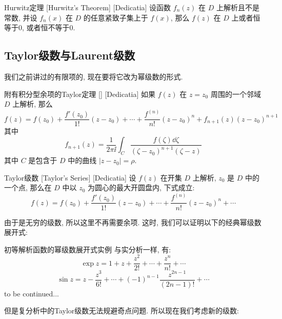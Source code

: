\documentclass[UTF8]{ctexart}
\newcommand{\continued}{{\Large to be continued...}}
\begin{document}
        \begin{thm}
            [UUID]
            {Hurwitz定理}
            [Hurwitz's Theorem]
            [Dedicatia]
            设函数 \(f_n(z)\) 在 \(D\) 上解析且不是常数, 并设 \(f_n(x)\) 在 \(D\) 的任意紧致子集上\UniformConvergence 于 \(f(x)\), 那么 \(f(z)\) 在 \(D\) 上或者恒等于0, 或者恒不等于0.
        \end{thm}
    
    \subsection{Taylor级数与Laurent级数}

        我们之前讲过的有限项的\TaylorThm, 现在要将它改为幂级数的形式. 

        \begin{thm}
            [UUID]
            {附有积分型余项的Taylor定理}
            []
            [Dedicatia]
            如果 \(f(z)\) 在 \(z=z_0\) 周围的一个邻域 \(D\) 上解析, 那么
            \[f(z)=f(z_0)+\frac{f'(z_0)}{1!}(z-z_0)+\cdots+\frac{f^{(n)}}{n!}(z-z_0)^n+f_{n+1}(z)(z-z_0)^{n+1}\]
            其中
            \[f_{n+1}(z)=\frac{1}{2\pi\ii}\int_C\frac{f(\zeta)\dd{\zeta}}{(\zeta-z_0)^{n+1}(\zeta-z)}\]
            其中 \(C\) 是包含于 \(D\) 中的曲线 \(|z-z_0|=\rho\). 
        \end{thm}

        \begin{thm}
            [TaylorSeries]
            {Taylor级数}
            [Taylor's Series]
            [Dedicatia]
            设 \(f(z)\) 在开集 \(D\) 上解析,  \(z_0\) 是 \(D\) 中的一个点, 那么在 \(D\) 中以 \(z_0\) 为圆心的最大开圆盘内, 下式成立: 
            \[f(z)=f(z_0)+\frac{f'(z_0)}{1!}(z-z_0)+\cdots+\frac{f^{(n)}}{n!}(z-z_0)^n+\cdots\]
        \end{thm}

        由于是无穷的级数, 所以这里不再需要余项. 这时, 我们可以证明以下的经典幂级数展开式: 

        \begin{xmp}
            {初等解析函数的幂级数展开式实例\label{xmp:TaylorCommon}}
            与实分析一样, 有: 
            \[\exp z=1+z+\frac{z^2}{2!}+\cdots+\frac{z^n}{n!}+\cdots\]
            \[\sin z=z-\frac{z^3}{6!}+\cdots+(-1)^{n-1}\frac{z^{2n-1}}{(2n-1)!}+\cdots\]
            \continued
        \end{xmp}

        但是复分析中的Taylor级数无法规避奇点问题. 所以现在我们考虑新的级数: 
\end{document}
